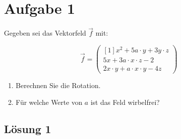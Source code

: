 \documentclass[main.tex]{subfiles}
\begin{document}
\section{Aufgabe 1}
Gegeben sei das Vektorfeld $\vec{f}$ mit:

$$
    \vec{f} = \begin{pmatrix}[1]
        x^2 + 5a \cdot y + 3y\cdot z \\
        5x + 3a\cdot x\cdot z - 2 \\
        2x\cdot y + a\cdot x \cdot y - 4z
    \end{pmatrix}
$$
\begin{enumerate}
    \item Berechnen Sie die Rotation.
    \item Für welche Werte von $a$ ist das Feld wirbelfrei?
\end{enumerate}

\subsection{Lösung 1}
\end{document}
